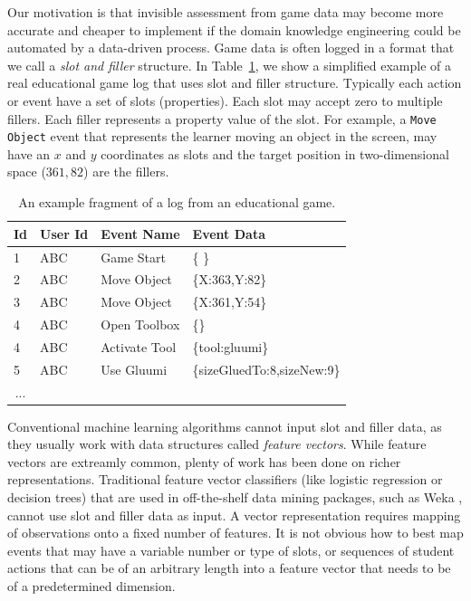 \documentclass{sigchi}
\begin{document}
Our motivation is that invisible assessment from game data may become more accurate and cheaper to implement if the domain knowledge engineering could be automated by a data-driven process.
Game data is often logged  in a format that we call a \textit{slot and filler} structure.
In Table~\ref{tbl:log_example}, we show a simplified example of a real educational game log that uses slot and filler structure.
Typically each action or event have a set of slots (properties).
Each slot may accept zero to multiple fillers. 
Each filler represents a property value of the slot.
For example, a \texttt{Move Object} event  that represents the learner moving an object in the screen, may have an $x$ and $y$ coordinates as slots and the target position in two-dimensional space ($361, 82$) are the fillers.

\begin{table}[tbh]
	\begin{tabular}{@{}llll@{}}
		\toprule
		\textbf{Id}             & \textbf{User Id} & \textbf{Event Name} & \textbf{Event Data}        \\ \midrule
		1                       & ABC              & Game Start          & \{ \}                        \\
		2                       & ABC              & Move Object         & \{X:363,Y:82\} \\
		3                       & ABC              & Move Object         & \{X:361,Y:54\} \\
		4                       & ABC              & Open Toolbox        & \{\}        \\
		4                       & ABC              & Activate Tool        & \{tool:gluumi\}        \\
		5                       & ABC              & Use Gluumi        & \{sizeGluedTo:8,sizeNew:9\} \\        
		\multicolumn{1}{c}{...} &                  &                     &                            \\ \bottomrule
	\end{tabular}
	\caption{An example fragment of a log from an educational game. \label{tbl:log_example}}
\end{table}


Conventional machine learning algorithms cannot input slot and filler data, as they  usually work with data structures called \textit{feature vectors}. 
While feature vectors are extreamly common, plenty of work has been done on richer representations.
Traditional feature vector classifiers (like logistic regression or decision trees)  that are used in off-the-shelf data mining packages, such as Weka \cite{hall2009weka}, cannot  use slot and filler data as input. 
A vector representation requires mapping of observations onto a fixed number of features.
It is not obvious how to best map events that may have a variable number or type of slots, or sequences of student actions that can be of an arbitrary length into a feature vector that needs to be of a predetermined dimension.
\end{document}
